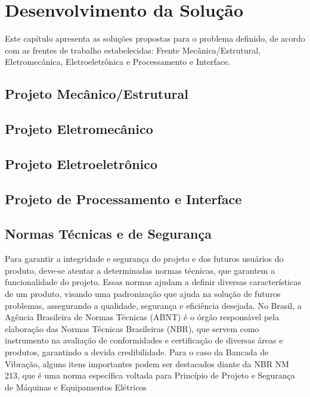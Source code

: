 \chapter{Desenvolvimento da Solução}
\label{desenvolvimento}

Este capítulo apresenta as soluções propostas para o problema definido, de acordo com as frentes de trabalho estabelecidas: Frente Mecânica/Estrutural, Eletromecânica, Eletroeletrônica e Processamento e Interface.

\section{Projeto Mecânico/Estrutural}



\section{Projeto Eletromecânico}



\section{Projeto Eletroeletrônico}



\section{Projeto de Processamento e Interface}



\section{Normas Técnicas e de Segurança}
Para garantir a integridade e segurança do projeto e dos futuros usuários do produto, deve-se atentar a determinadas normas técnicas, que garantem a funcionalidade do projeto. Essas normas ajudam a definir diversas características de um produto, visando uma padronização que ajuda na solução de futuros problemas, assegurando a qualidade, segurança e eficiência desejada. No Brasil, a Agência Brasileira de Normas Técnicas (ABNT) é o órgão responsável pela elaboração das Normas Técnicas Brasileiras (NBR), que servem como instrumento na avaliação de conformidades e certificação de diversas áreas e produtos, garantindo a devida credibilidade. Para o caso da Bancada de Vibração, alguns itens importantes podem ser destacados diante da NBR NM 213, que é uma norma específica voltada para Princípio de Projeto e Segurança de Máquinas e Equipamentos Elétricos

